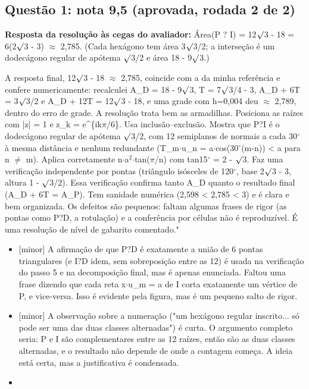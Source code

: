 \documentclass{article}%
\begin{document}
\subsection*{Questão 1: nota 9,5 (aprovada, rodada 2 de 2)}%
\textbf{Resposta da resolução às cegas do avaliador:} Área(P ? I) = 12$\surd$3 - 18 = 6(2$\surd$3 - 3) $\approx$ 2,785. (Cada hexágono tem área 3$\surd$3/2; a interseção é um dodecágono regular de apótema $\surd$3/2 e área 18 - 9$\surd$3.)\par %
A resposta final, 12$\surd$3 - 18 $\approx$ 2,785, coincide com a da minha referência e confere numericamente: recalculei A\_D = 18 - 9$\surd$3, T = 7$\surd$3/4 - 3, A\_D + 6T = 3$\surd$3/2 e A\_D + 12T = 12$\surd$3 - 18, e uma grade com h=0,004 deu $\approx$ 2,789, dentro do erro de grade. A resolução trata bem as armadilhas. Posiciona as raízes com |z| = 1 e z\_k = e\^{}\{ik$\pi$/6\}. Usa inclusão--exclusão. Mostra que P?I é o dodecágono regular de apótema $\surd$3/2, com 12 semiplanos de normais a cada 30$^\circ$ à mesma distância e nenhum redundante (T\_m$\cdot$u\_n = a$\cdot$cos(30$^\circ$(m-n)) < a para n $\neq$ m). Aplica corretamente n$\cdot$a$^2$$\cdot$tan($\pi$/n) com tan15$^\circ$ = 2 - $\surd$3. Faz uma verificação independente por pontas (triângulo isósceles de 120$^\circ$, base 2$\surd$3 - 3, altura 1 - $\surd$3/2). Essa verificação confirma tanto A\_D quanto o resultado final (A\_D + 6T = A\_P). Tem sanidade numérica (2,598 < 2,785 < 3) e é clara e bem organizada. Os defeitos são pequenos: faltam algumas frases de rigor (as pontas como P?D, a rotulação) e a conferência por células não é reproduzível. É uma resolução de nível de gabarito comentado."%
\begin{itemize}%
\item%
{[}minor{]} A afirmação de que P?D é exatamente a união de 6 pontas triangulares (e I?D idem, sem sobreposição entre as 12) é usada na verificação do passo 5 e na decomposição final, mas é apenas enunciada. Faltou uma frase dizendo que cada reta x$\cdot$u\_m = a de I corta exatamente um vértice de P, e vice{-}versa. Isso é evidente pela figura, mas é um pequeno salto de rigor.%
\item%
{[}minor{]} A observação sobre a numeração ("um hexágono regular inscrito... só pode ser uma das duas classes alternadas") é curta. O argumento completo seria: P e I são complementares entre as 12 raízes, então são as duas classes alternadas, e o resultado não depende de onde a contagem começa. A ideia está certa, mas a justificativa é condensada.%
\item%

\end{itemize}$$
\end{document}
